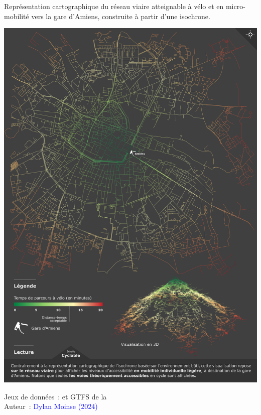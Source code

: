 \begin{refsegment}
    \begin{carte}[h!]\vspace*{4pt}
        \caption{Représentation cartographique du réseau viaire atteignable à vélo et en micro-mobilité vers la gare d'Amiens, construite à partir d'une isochrone.}
        \label{fig-chap3:isochrone-amiens-voirie}
        \centerline{\includegraphics[width=1\columnwidth]{src/Figures/Chap-3/FR_Carte_Isochrone_Amiens_Voirie.png}}
        \vspace{5pt}
        \begin{flushright}\scriptsize{
        Jeux de données~: \textcolor{blue}{\textcite{openstreetmap_openstreetmap_2023}} et \acrshort{GTFS} de la \textcolor{blue}{\textcite{sncf_reseau_2024}}
        \\
        Auteur~: \textcolor{blue}{Dylan Moinse (2024)}
        }\end{flushright}
    \end{carte}


\end{refsegment}
